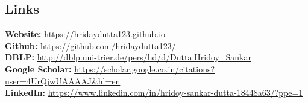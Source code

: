 \documentclass[margin, centered]{res}
\begin{document}
\begin{resume}
\section{Links}
\textbf{Website:} \url{https://hridaydutta123.github.io} \\
\textbf{Github:} \url{https://github.com/hridaydutta123/} \\
\textbf{DBLP:} \url{http://dblp.uni-trier.de/pers/hd/d/Dutta:Hridoy_Sankar} \\
\textbf{Google Scholar:} \url{https://scholar.google.co.in/citations?user=4UrQjwUAAAAJ&hl=en} \\
\textbf{LinkedIn:} \url{https://www.linkedin.com/in/hridoy-sankar-dutta-18448a63/?ppe=1} \\



\end{resume}
\end{document}
